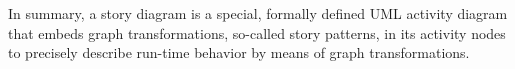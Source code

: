 In summary, a story diagram is a special, formally defined UML activity diagram
that embeds graph transformations, so-called story patterns, in its activity nodes
to precisely describe run-time behavior by means of graph transformations.

